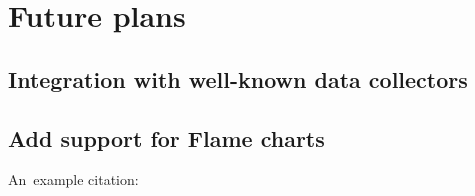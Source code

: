 \documentclass[12pt,a4paper]{report}
\let\openright=\clearpage
\begin{document}
\section{Future plans}
\subsection{Integration with well-known data collectors}
\subsection{Add support for Flame charts}
An~example citation: \cite{Andel07}






\listoffigures

\listoftables



\openright
\end{document}

